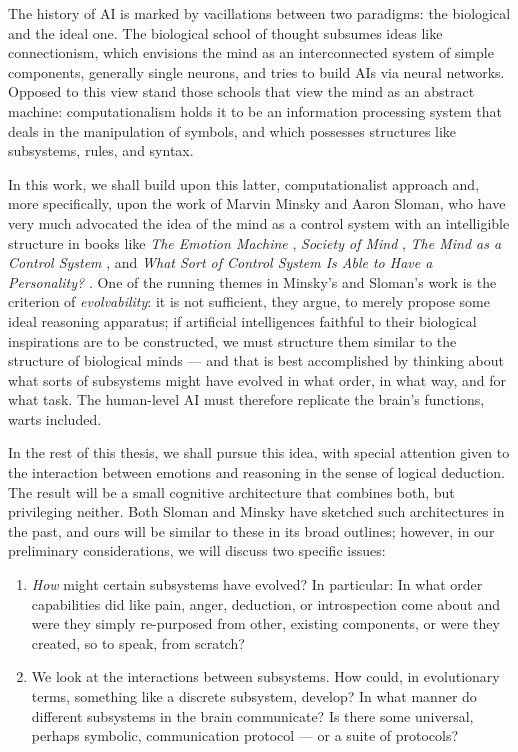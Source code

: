 The history of AI is marked by vacillations between two paradigms: the biological and the ideal one. The biological school of thought subsumes ideas like connectionism, which envisions the mind as an interconnected system of simple components, generally single neurons, and tries to build AIs via neural networks. Opposed to this view stand those schools that view the mind as an abstract machine: computationalism holds it to be an information processing system that deals in the manipulation of symbols, and which possesses structures like subsystems, rules, and syntax.

In this work, we shall build upon this latter, computationalist approach and, more specifically, upon the work of Marvin Minsky and Aaron Sloman, who have very much advocated the idea of the mind as a control system with an intelligible structure in books like {\em The Emotion Machine} \cite{emotionMachine}, {\em Society of Mind} \cite{societyOfMind}, {\em The Mind as a Control System} \cite{sloman1993}, and {\em What Sort of Control System Is Able to Have a Personality?} \cite{sloman1997}. One of the running themes in Minsky's and Sloman's work is the criterion of \emph{evolvability}: it is not sufficient, they argue, to merely propose some ideal reasoning apparatus; if artificial intelligences faithful to their biological inspirations are to be constructed, we must structure them similar to the structure of biological minds --- and that is best accomplished by thinking about what sorts of subsystems might have evolved in what order, in what way, and for what task. The human-level AI must therefore replicate the brain's functions, warts included.

In the rest of this thesis, we shall pursue this idea, with special attention given to the interaction between emotions and reasoning in the sense of logical deduction. The result will be a small cognitive architecture that combines both, but privileging neither. Both Sloman and Minsky have sketched such architectures in the past, and ours will be similar to these in its broad outlines; however, in our preliminary considerations, we will discuss two specific issues:

\begin{enumerate}
	\item \emph{How} might certain subsystems have evolved? In particular: In what order capabilities did like pain, anger, deduction, or introspection come about and were they simply re-purposed from other, existing components, or were they created, so to speak, from scratch?
	\item We look at the interactions between subsystems. How could, in evolutionary terms, something like a discrete subsystem, develop? In what manner do different subsystems in the brain communicate? Is there some universal, perhaps symbolic, communication protocol --- or a suite of protocols?
\end{enumerate}

